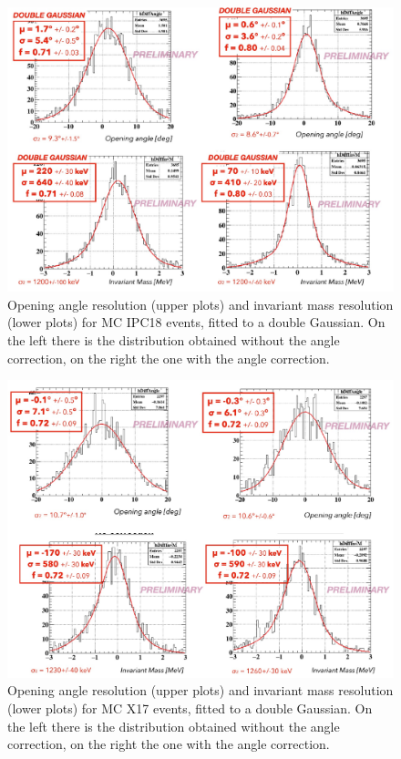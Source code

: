 \begin{refsection}
        \begin{figure}[]
            \centering
            \includegraphics[scale=0.5]{Figures/X17/Analysis/AngCorrReso.pdf}
            \caption{Opening angle resolution (upper plots) and invariant mass resolution (lower plots) for MC IPC18 events, fitted to a double Gaussian. On the left there is the distribution obtained without the angle correction, on the right the one with the angle correction.}
              \label{fig:corrIPC}
        \end{figure}
        \begin{figure}[]
            \centering
            \includegraphics[scale=0.5]{Figures/X17/Analysis/CorrAngleX17.pdf}
            \caption{Opening angle resolution (upper plots) and invariant mass resolution (lower plots) for MC X17 events, fitted to a double Gaussian. On the left there is the distribution obtained without the angle correction, on the right the one with the angle correction.}
            \label{fig:corrX17}
        \end{figure}


\end{refsection}
